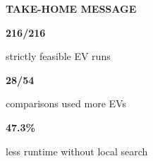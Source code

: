 \documentclass[final]{beamer}
\begin{document}
\begin{frame}[t]
\vspace{0.35cm}
\hspace{0.022\paperwidth}%
\begin{minipage}{0.956\paperwidth}
\begin{finalbox}
\centering
{\fontsize{30}{36}\selectfont\bfseries TAKE-HOME MESSAGE}\par
\vspace{0.45cm}
\begin{minipage}{0.30\linewidth}\centering
  {\fontsize{42}{48}\selectfont\bfseries 216/216}\par
  {\fontsize{21}{26}\selectfont strictly feasible EV runs}
\end{minipage}\hfill
\begin{minipage}{0.30\linewidth}\centering
  {\fontsize{42}{48}\selectfont\bfseries 28/54}\par
  {\fontsize{21}{26}\selectfont comparisons used more EVs}
\end{minipage}\hfill
\begin{minipage}{0.30\linewidth}\centering
  {\fontsize{42}{48}\selectfont\bfseries 47.3\%}\par
  {\fontsize{21}{26}\selectfont less runtime without local search}
\end{minipage}
\end{finalbox}
\end{minipage}
\end{frame}
\end{document}
